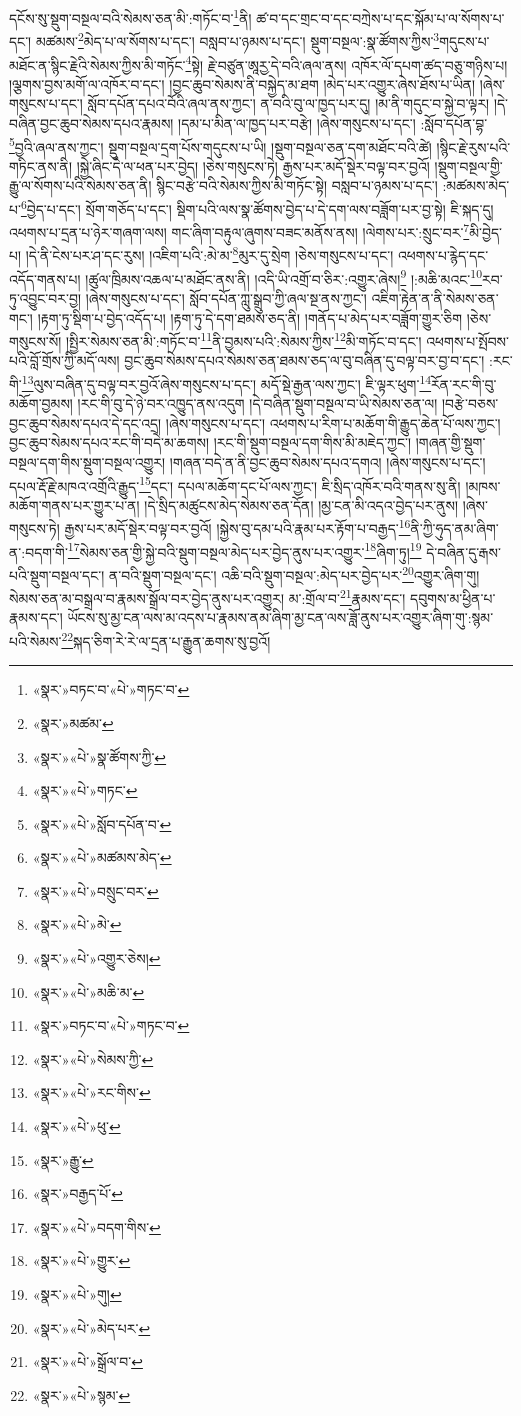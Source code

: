 དངོས་སུ་སྡུག་བསྔལ་བའི་སེམས་ཅན་མི་:གཏོང་བ་\footnote{«སྣར་»བཏང་བ་«པེ་»གཏང་བ་}ནི། ཚ་བ་དང་གྲང་བ་དང་བཀྲེས་པ་དང་སྐོམ་པ་ལ་སོགས་པ་དང་། མཚམས་\footnote{«སྣར་»མཚམ་}མེད་པ་ལ་སོགས་པ་དང་། བསླབ་པ་ཉམས་པ་དང་། སྡུག་བསྔལ་:སྣ་ཚོགས་ཀྱིས་\footnote{«སྣར་»«པེ་»སྣ་ཚོགས་ཀྱི་}གདུངས་པ་མཐོང་ན་སྙིང་རྗེའི་སེམས་ཀྱིས་མི་གཏོང་\footnote{«སྣར་»«པེ་»གཏང་}སྟེ། རྗེ་བཙུན་ཨཱརྱ་དེ་བའི་ཞལ་ནས། འཁོར་ལོ་དཔག་ཚད་བཅུ་གཉིས་པ། །ལྕགས་བྱས་མགོ་ལ་འཁོར་བ་དང་། །བྱང་ཆུབ་སེམས་ནི་བསྐྱེད་མ་ཐག །མེད་པར་འགྱུར་ཞེས་ཐོས་པ་ཡིན། །ཞེས་གསུངས་པ་དང་། སློབ་དཔོན་དཔའ་བོའི་ཞལ་ནས་ཀྱང་། ན་བའི་བུ་ལ་ཁྱད་པར་དུ། །མ་ནི་གདུང་བ་སྐྱེ་བ་ལྟར། །དེ་བཞིན་བྱང་ཆུབ་སེམས་དཔའ་རྣམས། །དམ་པ་མིན་ལ་ཁྱད་པར་བརྩེ། །ཞེས་གསུངས་པ་དང་། :སློབ་དཔོན་བྷ་\footnote{«སྣར་»«པེ་»སློབ་དཔོན་བ་}བྱའི་ཞལ་ནས་ཀྱང་། སྡུག་བསྔལ་དྲག་པོས་གདུངས་པ་ཡི། །སྡུག་བསྔལ་ཅན་དག་མཐོང་བའི་ཚེ། །སྙིང་རྗེ་རུས་པའི་གཏིང་ནས་ནི། །སྐྱེ་ཞིང་དེ་ལ་ཕན་པར་བྱེད། །ཅེས་གསུངས་ཏེ། རྒྱས་པར་མདོ་སྡེར་བལྟ་བར་བྱའོ། །སྡུག་བསྔལ་གྱི་རྒྱུ་ལ་སོགས་པའི་སེམས་ཅན་ནི། སྙིང་བརྩེ་བའི་སེམས་ཀྱིས་མི་གཏོང་སྟེ། བསླབ་པ་ཉམས་པ་དང་། :མཚམས་མེད་པ་\footnote{«སྣར་»«པེ་»མཚམས་མེད་}བྱེད་པ་དང་། སྲོག་གཅོད་པ་དང་། སྡིག་པའི་ལས་སྣ་ཚོགས་བྱེད་པ་དེ་དག་ལས་བཟློག་པར་བྱ་སྟེ། ཇི་སྐད་དུ། འཕགས་པ་དྲན་པ་ཉེར་གཞག་ལས། གང་ཞིག་བརྟུལ་ཞུགས་བཟང་མནོས་ནས། །ལེགས་པར་:སྲུང་བར་\footnote{«སྣར་»«པེ་»བསྲུང་བར་}མི་བྱེད་པ། །དེ་ནི་ངེས་པར་ཤ་དང་རུས། །འཇིག་པའི་:མེ་མ་\footnote{«སྣར་»«པེ་»མེ་}མུར་དུ་སྲེག །ཅེས་གསུངས་པ་དང་། འཕགས་པ་རྙེད་དང་འདོད་གནས་པ། །ཚུལ་ཁྲིམས་འཆལ་པ་མཐོང་ནས་ནི། །འདི་ཡི་འགྲོ་བ་ཅིར་:འགྱུར་ཞེས།\footnote{«སྣར་»«པེ་»འགྱུར་ཅེས།} །:མཆི་མའང་\footnote{«སྣར་»«པེ་»མཆི་མ་}རབ་ཏུ་འབྱུང་བར་བྱ། །ཞེས་གསུངས་པ་དང་། སློབ་དཔོན་ཀླུ་སྒྲུབ་ཀྱི་ཞལ་སྔ་ནས་ཀྱང་། འཇིག་རྟེན་ན་ནི་སེམས་ཅན་གང་། །རྟག་ཏུ་སྡིག་པ་བྱེད་འདོད་པ། །རྟག་ཏུ་དེ་དག་ཐམས་ཅད་ནི། །གནོད་པ་མེད་པར་བཟློག་གྱུར་ཅིག །ཅེས་གསུངས་སོ། །སྤྱིར་སེམས་ཅན་མི་:གཏོང་བ་\footnote{«སྣར་»བཏང་བ་«པེ་»གཏང་བ་}ནི་བྱམས་པའི་:སེམས་ཀྱིས་\footnote{«སྣར་»«པེ་»སེམས་ཀྱི་}མི་གཏོང་བ་དང་། འཕགས་པ་སྤོབས་པའི་བློ་གྲོས་ཀྱི་མདོ་ལས། བྱང་ཆུབ་སེམས་དཔའ་སེམས་ཅན་ཐམས་ཅད་ལ་བུ་བཞིན་དུ་བལྟ་བར་བྱ་བ་དང་། :རང་གི་\footnote{«སྣར་»«པེ་»རང་གིས་}ལུས་བཞིན་དུ་བལྟ་བར་བྱའོ་ཞེས་གསུངས་པ་དང་། མདོ་སྡེ་རྒྱན་ལས་ཀྱང་། ཇི་ལྟར་ཕུག་\footnote{«སྣར་»«པེ་»ཕུ་}རོན་རང་གི་བུ་མཆོག་བྱམས། །རང་གི་བུ་དེ་ཉེ་བར་འཁྱུད་ནས་འདུག །དེ་བཞིན་སྡུག་བསྔལ་བ་ཡི་སེམས་ཅན་ལ། །བརྩེ་བཅས་བྱང་ཆུབ་སེམས་དཔའ་དེ་དང་འདྲ། །ཞེས་གསུངས་པ་དང་། འཕགས་པ་རིག་པ་མཆོག་གི་རྒྱུད་ཆེན་པོ་ལས་ཀྱང་། བྱང་ཆུབ་སེམས་དཔའ་རང་གི་བདེ་མ་ཆགས། །རང་གི་སྡུག་བསྔལ་དག་གིས་མི་མཇེད་ཀྱང་། །གཞན་གྱི་སྡུག་བསྔལ་དག་གིས་སྡུག་བསྔལ་འགྱུར། །གཞན་བདེ་ན་ནི་བྱང་ཆུབ་སེམས་དཔའ་དགའ། །ཞེས་གསུངས་པ་དང་། དཔལ་རྡོ་རྗེ་མཁའ་འགྲོའི་རྒྱུད་\footnote{«སྣར་»རྒྱུ་}དང་། དཔལ་མཆོག་དང་པོ་ལས་ཀྱང་། ཇི་སྲིད་འཁོར་བའི་གནས་སུ་ནི། །མཁས་མཆོག་གནས་པར་གྱུར་པ་ན། །དེ་སྲིད་མཚུངས་མེད་སེམས་ཅན་དོན། །མྱ་ངན་མི་འདའ་བྱེད་པར་ནུས། །ཞེས་གསུངས་ཏེ། རྒྱས་པར་མདོ་སྡེར་བལྟ་བར་བྱའོ། །སྐྱེས་བུ་དམ་པའི་རྣམ་པར་རྟོག་པ་བརྒྱད་\footnote{«སྣར་»བརྒྱད་པོ་}ནི་ཀྱི་ཧུད་ནམ་ཞིག་ན་:བདག་གི་\footnote{«སྣར་»«པེ་»བདག་གིས་}སེམས་ཅན་གྱི་སྐྱེ་བའི་སྡུག་བསྔལ་མེད་པར་བྱེད་ནུས་པར་འགྱུར་\footnote{«སྣར་»«པེ་»གྱུར་}ཞིག་ཏུ།\footnote{«སྣར་»«པེ་»གུ།} དེ་བཞིན་དུ་རྒས་པའི་སྡུག་བསྔལ་དང་། ན་བའི་སྡུག་བསྔལ་དང་། འཆི་བའི་སྡུག་བསྔལ་:མེད་པར་བྱེད་པར་\footnote{«སྣར་»«པེ་»མེད་པར་}འགྱུར་ཞིག་གུ། སེམས་ཅན་མ་བསྒྲལ་བ་རྣམས་སྒྲོལ་བར་བྱེད་ནུས་པར་འགྱུར། མ་:གྲོལ་བ་\footnote{«སྣར་»«པེ་»སྒྲོལ་བ་}རྣམས་དང་། དབུགས་མ་ཕྱིན་པ་རྣམས་དང་། ཡོངས་སུ་མྱ་ངན་ལས་མ་འདས་པ་རྣམས་ནམ་ཞིག་མྱ་ངན་ལས་ཟློ་ནུས་པར་འགྱུར་ཞིག་གུ་:སྙམ་པའི་སེམས་\footnote{«སྣར་»«པེ་»སྙམ་}སྐད་ཅིག་རེ་རེ་ལ་དྲན་པ་རྒྱུན་ཆགས་སུ་བྱའོ། 